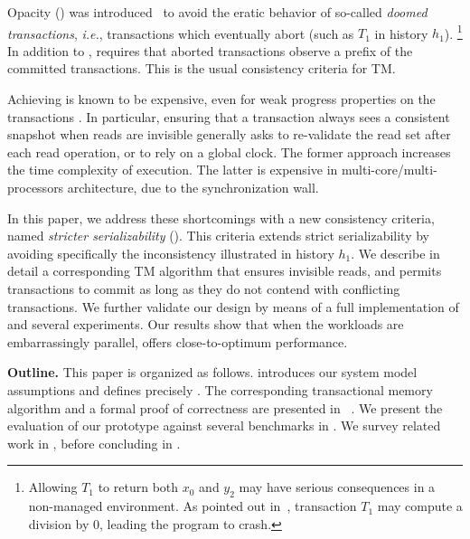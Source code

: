 Opacity (\OPA) was introduced~\cite{guerraoui2008correctness} to avoid the eratic behavior of so-called \emph{doomed transactions}, \emph{i.e.}, transactions which eventually abort (such as $T_1$ in history $h_1$).%
\footnote{
  Allowing $T_1$ to return both $x_0$ and $y_2$ may have serious consequences in a non-managed environment.
  As pointed out in~\cite{guerraoui2008correctness}, transaction $T_1$ may compute a division by $0$, leading the program to crash.
}
In addition to \SSER, \OPA requires that aborted transactions observe a prefix of the committed transactions.
This is the usual consistency criteria for TM.

Achieving \OPA is known to be expensive, even for weak progress properties on the transactions \cite{Ravi17}.
In particular, ensuring that a transaction always sees a consistent snapshot when reads are invisible generally asks to re-validate the read set after each read operation, or to rely on a global clock.
The former approach increases the time complexity of execution.
The latter is expensive in multi-core/multi-processors architecture, due to the synchronization wall.

In this paper, we address these shortcomings with a new consistency criteria, named \emph{stricter serializability} (\SPSER).
This criteria extends strict serializability by avoiding specifically the inconsistency illustrated in history $h_1$.
We describe in detail a corresponding TM algorithm that ensures invisible reads, and permits transactions to commit as long as they do not contend with conflicting transactions.
We further validate our design by means of a full implementation of \SPSER and several experiments.
Our results show that when the workloads are embarrassingly parallel, \SPSER offers close-to-optimum performance.

\textbf{Outline.}
This paper is organized as follows.
 introduces our system model assumptions and defines precisely \SPSER.
The corresponding transactional memory algorithm and a formal proof of correctness are presented in ~.
We present the evaluation of our prototype against several benchmarks in .
We survey related work in , before concluding in .
